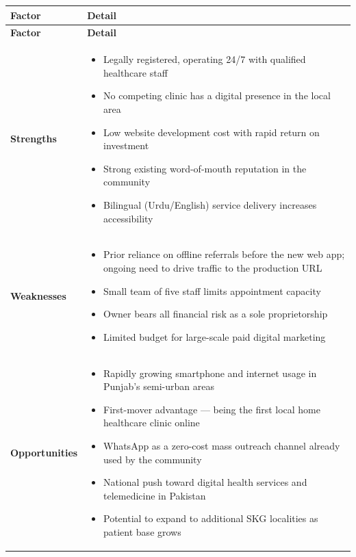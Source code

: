 \documentclass[12pt, a4paper]{article}
\begin{document}
\begin{longtable}{@{} L{3cm} L{11.4cm} @{}}
\toprule
\textbf{Factor} & \textbf{Detail} \\
\midrule
\endfirsthead
\toprule
\textbf{Factor} & \textbf{Detail} \\
\midrule
\endhead
\textbf{Strengths} &
\begin{itemize}[leftmargin=1em, topsep=2pt, itemsep=2pt]
    \item Legally registered, operating 24/7 with qualified healthcare staff
    \item No competing clinic has a digital presence in the local area
    \item Low website development cost with rapid return on investment
    \item Strong existing word-of-mouth reputation in the community
    \item Bilingual (Urdu/English) service delivery increases accessibility
\end{itemize} \\[4pt]

\textbf{Weaknesses} &
\begin{itemize}[leftmargin=1em, topsep=2pt, itemsep=2pt]
    \item Prior reliance on offline referrals before the new web app; ongoing need to drive traffic to the production URL
    \item Small team of five staff limits appointment capacity
    \item Owner bears all financial risk as a sole proprietorship
    \item Limited budget for large-scale paid digital marketing
\end{itemize} \\[4pt]

\textbf{Opportunities} &
\begin{itemize}[leftmargin=1em, topsep=2pt, itemsep=2pt]
    \item Rapidly growing smartphone and internet usage in Punjab's semi-urban areas
    \item First-mover advantage — being the first local home healthcare clinic online
    \item WhatsApp as a zero-cost mass outreach channel already used by the community
    \item National push toward digital health services and telemedicine in Pakistan
    \item Potential to expand to additional SKG localities as patient base grows
\end{itemize} \\[4pt]


\end{longtable}
\end{document}
